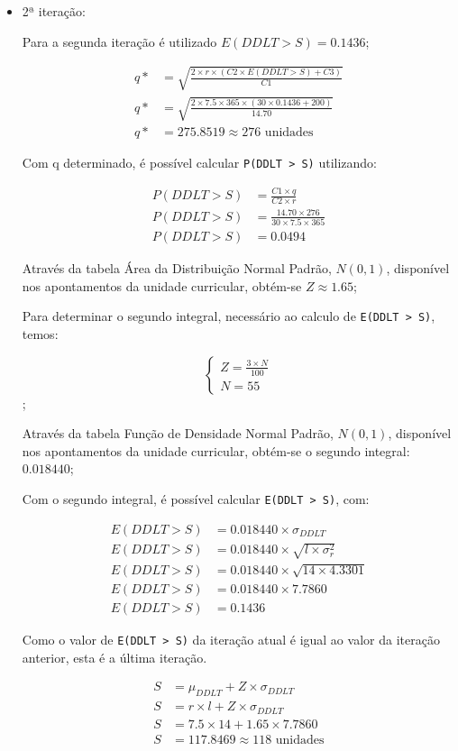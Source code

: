 \begin{itemize}
	
\item 2ª iteração:
	
	Para a segunda iteração é utilizado $E(DDLT > S) = 0.1436$;
	
	\begin{align*}	
	q*&=\sqrt{\frac{2 \times r \times (C2 \times E(DDLT > S) + C3)}{C1}}\\
	q*&=\sqrt{\frac{2 \times 7.5 \times 365 \times (30 \times 0.1436
	+ 200)}{14.70}}\\
	q*&=275.8519 \approx 276 \text{ unidades}
	\end{align*}

	Com q determinado, é possível calcular \texttt{P(DDLT > S)} utilizando:

	\begin{align*}	
	P(DDLT > S)&=\frac{C1 \times q}{C2 \times r}\\
	P(DDLT > S)&=\frac{14.70 \times 276}{30 \times 7.5 \times 365}\\
	P(DDLT > S)&=0.0494
	\end{align*}

	Através da tabela Área da Distribuição Normal Padrão, $N(0,1)$, disponível
	nos apontamentos da unidade curricular, obtém-se $Z \approx 1.65$;
	
	Para determinar o segundo integral, necessário ao calculo de \texttt{E(DDLT > S)}, temos:
	
	$$
	\begin{cases}
		Z=\frac{3 \times N}{100}\\
	  N=55
	\end{cases}	
	$$;

	Através da tabela Função de Densidade Normal Padrão, $N(0,1)$, disponível
	nos apontamentos da unidade curricular, obtém-se o segundo integral:
	$0.018440$;

	Com o segundo integral, é possível calcular \texttt{E(DDLT > S)}, com:

	\begin{align*}	
	E(DDLT > S) &= 0.018440 \times \sigma_{DDLT}\\
	E(DDLT > S) &= 0.018440 \times \sqrt{l \times \sigma_r^2}\\
	E(DDLT > S) &= 0.018440 \times \sqrt{14 \times 4.3301}\\
	E(DDLT > S) &= 0.018440 \times 7.7860\\
	E(DDLT > S) &= 0.1436
	\end{align*}

	Como o valor de \texttt{E(DDLT > S)} da iteração atual é igual ao valor da iteração
	anterior, esta é a última iteração.

	\begin{align*}	
	S &= \mu_{DDLT} + Z \times \sigma_{DDLT}\\
	S &= r \times l + Z \times \sigma_{DDLT}\\
	S &= 7.5 \times 14 + 1.65 \times 7.7860\\
	S &= 117.8469 \approx 118 \text{ unidades}
	\end{align*}

\end{itemize}

